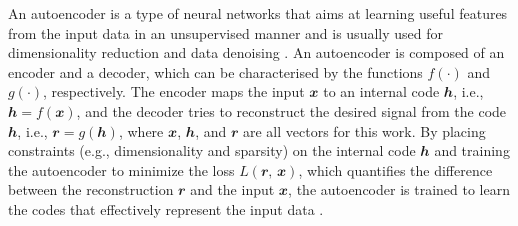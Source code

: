 \documentclass[fleqn,usenatbib]{mnras}
\newcommand{\B}[1]{\mathbfit{#1}}
\newcommand{\editone}[1]{{\leavevmode\color{cyan}#1}}
\begin{document}
\editone{%
An autoencoder is a type of neural networks that aims at learning useful
features from the input data in an unsupervised manner and is usually
used for dimensionality reduction \citep[e.g.,][]{hinton2006,wang2014}
and data denoising \citep[e.g.,][]{xie2012,lu2013,bengio2013}.}  %
An autoencoder is composed of an encoder and a decoder, which can be
characterised by the functions $f(\cdot)$ and $g(\cdot)$, respectively.
The encoder maps the input $\B{x}$ to an internal code $\B{h}$, i.e.,
$\B{h} = f(\B{x})$, and the decoder tries to reconstruct the desired
signal from the code $\B{h}$, i.e., $\B{r} = g(\B{h})$, where $\B{x}$,
$\B{h}$, and $\B{r}$ are all vectors for this work.
By placing constraints (e.g., dimensionality and sparsity) on the
internal code $\B{h}$ and training the autoencoder to minimize the
loss $L(\B{r}, \,\B{x})$, which quantifies the difference between the
reconstruction $\B{r}$ and the input $\B{x}$, the autoencoder is trained
to learn the codes that effectively represent the input data
\citep[e.g.,][chapter 14]{goodfellow2016}.
\end{document}
